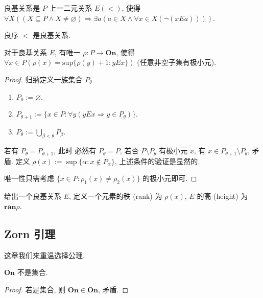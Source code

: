 \begin{definition}
    良基关系是 \(P\) 上一二元关系 \(E (<)\), 使得 \(\forall X ((X \subseteq P \land X \neq \varnothing) \Rightarrow \exists a (a \in X \land \forall x \in X (\neg(x E a))))\).
\end{definition}

\begin{example}
    良序 \(<\) 是良基关系.
\end{example}

\begin{theorem}
    对于良基关系 \(E\), 有唯一 \(\rho : P \to \mathbf{On}\), 使得 \(\forall x \in P (\rho(x) = \mathrm{sup} \{\rho(y) + 1 : y E x\})\) (任意非空子集有极小元).

    \begin{proof}
        归纳定义一族集合 \(P_\theta\)

        \begin{enumerate}
            \item \(P_0 := \varnothing\).
            \item \(P_{\theta + 1} := \{x \in P : \forall y (y E x \Rightarrow y \in P_\theta)\}\).
            \item \(P_\theta := \bigcup_{\beta < \theta} P_\beta\).
        \end{enumerate}

        若有 \(P_\theta = P_{\theta + 1}\), 此时
        必然有 \(P_\theta = P\), 若否 \(P \setminus P_\theta\) 有极小元 \(x\), 有 \(x \in P_{\theta + 1} \setminus P_{\theta}\), 矛盾.
        定义 \(\rho(x) := \sup \{\alpha : x \notin P_{\alpha}\}\), 上述条件的验证是显然的.

        唯一性只需考虑 \(\{x \in P : \rho_1 (x) \neq \rho_2 (x)\}\) 的极小元即可.
    \end{proof}
\end{theorem}

\begin{definition}
    给出一个良基关系 \(E\), 定义一个元素的秩 (rank) 为 \(\rho(x)\), \(E\) 的高 (height) 为 \(\mathbf{ran} \rho\).
\end{definition}


\subsection{Zorn 引理}

这章我们来重温选择公理.

\begin{lemma}
    \label{lemma:On is not a set}
    \(\mathbf{On}\) 不是集合.

    \begin{proof}
        若是集合, 则 \(\mathbf{On} \in \mathbf{On}\), 矛盾.
    \end{proof}
\end{lemma}

